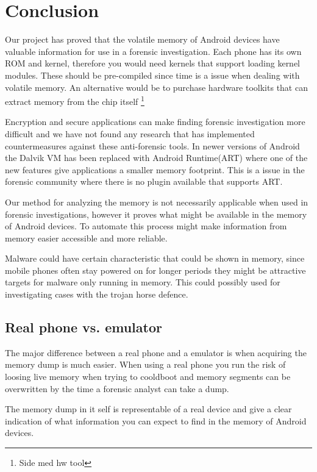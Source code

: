 \section{Conclusion}
Our project has proved that the volatile memory of Android devices have valuable information for use 
in a forensic investigation. %
Each phone has its own ROM and kernel, therefore you would need kernels that support loading kernel 
modules. These should be pre-compiled since time is a issue when dealing with volatile memory. An 
alternative would be to purchase hardware toolkits that can extract memory from the chip itself 
\footnote{Side med hw tool} %

Encryption and secure applications can make finding forensic investigation more difficult and we have not found 
any research that has implemented countermeasures against these anti-forensic tools. In newer versions 
of Android the Dalvik VM has been replaced with Android Runtime(ART) where one of the new 
features give applications a smaller memory footprint. This is a issue in the forensic community where there is no 
plugin available that supports ART.

Our method for analyzing the memory is not necessarily applicable when used in forensic investigations, 
however it proves what might be available in the memory of Android devices. 
To automate this process might make information from memory easier accessible and more reliable.

Malware could have certain characteristic that could be shown in memory, since mobile phones often stay 
powered on for longer periods they might be attractive targets for malware only running in memory. 
This could possibly used for investigating cases with the trojan horse defence.

\subsection{Real phone vs. emulator}
The major difference between a real phone and a emulator is when acquiring the memory dump is much 
easier. When using a real phone you run the risk of loosing live memory when trying to cooldboot and 
memory segments can be overwritten by the time a forensic analyst can take a dump.

The memory dump in it self is representable of a real device and give a clear indication of what 
information you can expect to find in the memory of Android devices.




